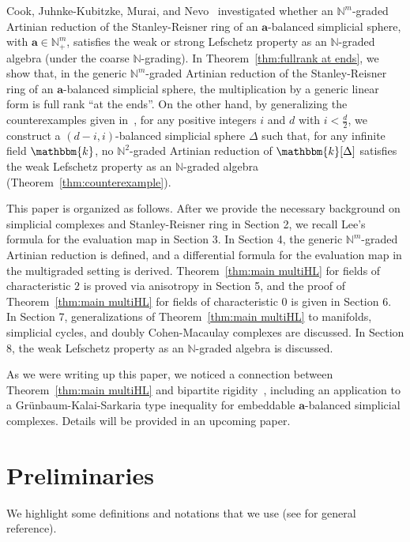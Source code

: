 Cook, Juhnke-Kubitzke, Murai, and Nevo~\cite{CJMN} investigated whether an $\mathbb{N}^m$-graded Artinian reduction of the Stanley-Reisner ring of an $\bm{a}$-balanced simplicial sphere, with $\bm{a} \in \mathbb{N}^m_+$, satisfies the weak or strong Lefschetz property as an $\mathbb{N}$-graded algebra (under the coarse $\mathbb{N}$-grading).
In Theorem~\ref{thm:fullrank at ends}, we show that, in the generic $\mathbb{N}^m$-graded Artinian reduction of the Stanley-Reisner ring of an $\bm{a}$-balanced simplicial sphere, the multiplication by a generic linear form is full rank ``at the ends''.
On the other hand, by generalizing the counterexamples given in~\cite{CJMN,Oba}, for any positive integers $i$ and $d$ with $i < \frac{d}{2}$, we construct a $(d-i,i)$-balanced simplicial sphere $\Delta$ such that, for any infinite field $\mathbbm{k}$, no $\mathbb{N}^2$-graded Artinian reduction of $\mathbbm{k}[\Delta]$ satisfies the weak Lefschetz property as an $\mathbb{N}$-graded algebra (Theorem~\ref{thm:counterexample}).

This paper is organized as follows.
After we provide the necessary background on simplicial complexes and Stanley-Reisner ring in Section 2, we recall Lee's formula for the evaluation map in Section 3.
In Section 4, the generic $\mathbb{N}^m$-graded Artinian reduction is defined, and a differential formula for the evaluation map in the multigraded setting is derived.
Theorem~\ref{thm:main multiHL} for fields of characteristic $2$ is proved via anisotropy in Section 5, and the proof of Theorem~\ref{thm:main multiHL} for fields of characteristic $0$ is given in Section 6.
In Section 7, generalizations of Theorem~\ref{thm:main multiHL} to manifolds, simplicial cycles, and doubly Cohen-Macaulay complexes are discussed.
In Section 8, the weak Lefschetz property as an $\mathbb{N}$-graded algebra is discussed.

As we were writing up this paper, we noticed a connection between Theorem~\ref{thm:main multiHL} and bipartite rigidity~\cite{KNN}, including an application to a Gr\"{u}nbaum-Kalai-Sarkaria type inequality for embeddable $\bm{a}$-balanced simplicial complexes.
Details will be provided in an upcoming paper.

\section{Preliminaries}
We highlight some definitions and notations that we use (see \cite{Sta-book} for general reference).
